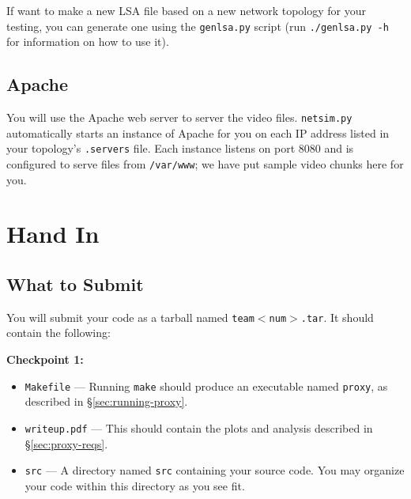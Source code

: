 \documentclass{article}
\begin{document}
If want to make a new LSA file based on a new network topology for your
testing, you can generate one using the \texttt{genlsa.py} script (run
\texttt{./genlsa.py -h} for information on how to use it).





%



\subsection{Apache}
\label{sec:apache}

You will use the Apache web server to server the video files.
\texttt{netsim.py} automatically starts an instance of Apache for you on each
IP address listed in your topology's \texttt{.servers} file. Each instance
listens on port 8080 and is configured to serve files from \texttt{/var/www};
we have put sample video chunks here for you.




\section{Hand In}

\subsection{What to Submit}

You will submit your code as a tarball named \texttt{team$<$num$>$.tar}. It
should contain the following:

\medskip \noindent \textbf{Checkpoint 1:}
\begin{itemize}
	\item \texttt{Makefile} --- Running \texttt{make} should produce an
	executable named \texttt{proxy}, as described in \S\ref{sec:running-proxy}.

	\item \texttt{writeup.pdf} --- This should contain the plots and analysis
	described in \S\ref{sec:proxy-reqs}. 

	\item \texttt{src} --- A directory named \texttt{src} containing your
	source code. You may organize your code within this directory as you see
	fit.
\end{itemize}
\end{document}
